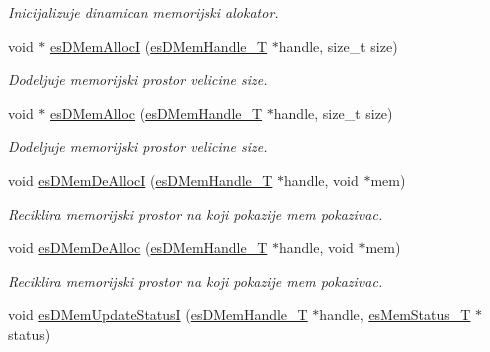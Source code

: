 \begin{DoxyCompactItemize}
\begin{DoxyCompactList}\small\item\em Inicijalizuje dinamican memorijski alokator. \end{DoxyCompactList}\item 
void $\ast$ \hyperlink{group__mem__impl_ga807a7d2e705b1802b7671c0c903611a6}{es\-D\-Mem\-Alloc\-I} (\hyperlink{group__mem__intf_gacaaf771b18b3da8fa3b67a466390080e}{es\-D\-Mem\-Handle\-\_\-\-T} $\ast$handle, size\-\_\-t size)
\begin{DoxyCompactList}\small\item\em Dodeljuje memorijski prostor velicine {\ttfamily size}. \end{DoxyCompactList}\item 
void $\ast$ \hyperlink{group__mem__impl_ga7aa5c1f6bda178e4860f0727b1fd3590}{es\-D\-Mem\-Alloc} (\hyperlink{group__mem__intf_gacaaf771b18b3da8fa3b67a466390080e}{es\-D\-Mem\-Handle\-\_\-\-T} $\ast$handle, size\-\_\-t size)
\begin{DoxyCompactList}\small\item\em Dodeljuje memorijski prostor velicine {\ttfamily size}. \end{DoxyCompactList}\item 
void \hyperlink{group__mem__impl_gad56192526f2b6ec1f927d21b15e1bc11}{es\-D\-Mem\-De\-Alloc\-I} (\hyperlink{group__mem__intf_gacaaf771b18b3da8fa3b67a466390080e}{es\-D\-Mem\-Handle\-\_\-\-T} $\ast$handle, void $\ast$mem)
\begin{DoxyCompactList}\small\item\em Reciklira memorijski prostor na koji pokazije {\ttfamily mem} pokazivac. \end{DoxyCompactList}\item 
void \hyperlink{group__mem__impl_gad63c5b88aae0a4626763d934fdcdc9d1}{es\-D\-Mem\-De\-Alloc} (\hyperlink{group__mem__intf_gacaaf771b18b3da8fa3b67a466390080e}{es\-D\-Mem\-Handle\-\_\-\-T} $\ast$handle, void $\ast$mem)
\begin{DoxyCompactList}\small\item\em Reciklira memorijski prostor na koji pokazije {\ttfamily mem} pokazivac. \end{DoxyCompactList}\item 
void \hyperlink{group__mem__impl_gad1bddd779876d000f8906ec7ac747fa4}{es\-D\-Mem\-Update\-Status\-I} (\hyperlink{group__mem__intf_gacaaf771b18b3da8fa3b67a466390080e}{es\-D\-Mem\-Handle\-\_\-\-T} $\ast$handle, \hyperlink{group__mem__intf_ga0eb568b68247d93e2db804a681de0e9e}{es\-Mem\-Status\-\_\-\-T} $\ast$status)

\end{DoxyCompactItemize}
